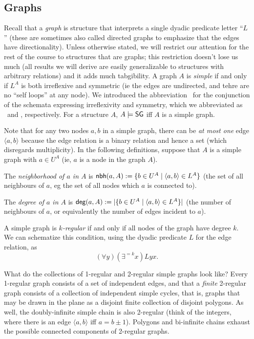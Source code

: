 \subsection*{Graphs}
Recall that a \emph{graph} is structure that interprets a single dyadic predicate letter ``$L$'' (these are sometimes also called directed graphs to emphasize that the edges have directionality). Unless otherwise stated, we will restrict our attention for the rest of the course to structures that are graphs; this restriction doesn't lose us much (all results we will derive are easily generalizable to structures with arbitrary relations) and it adds much tabgibility. A graph $A$ is \emph{simple} if and only if $L^A$ is both irreflexive and symmetric (ie the edges are undirected, and tehre are no ``self loops'' at any node). We introduced the abbreviation \sg\ for the conjunction of the schemata expressing irreflexivity and symmetry, which we abbreviated as \irr\ and \sym, respectively. For a structure $A$, $A \models \mbox{$\mathsf{SG}$}$ iff $A$ is a simple graph. 

Note that for any two nodes $a, b$ in a simple graph, there can be \emph{at most one} edge $\langle a, b \rangle$ because the edge relation is a binary relation and hence a set (which disregards multiplicity). In the following definitions, suppose that $A$ is a simple graph with $a \in U^A$ (ie, $a$ is a node in the graph $A$). 

\begin{definition}
The \emph{neighborhood of $a$ in $A$} is $\mbox{$\mathsf{nbh}(a,A)$} := \{b\in U^A\mid \mbox{$\langle a,b \rangle$}\in L^A\}$ (the set of all neighbours of $a$, eg the set of all nodes which $a$ is connected to). 
\end{definition}

\begin{definition}
The \emph{degree of $a$ in $A$} is $\mbox{$\mathsf{deg}(a,A)$} := \mbox{$|\{b\in U^A\mid \mbox{$\langle a,b \rangle$}\in L^A\}|$}$ (the number of neighbours of $a$, or equivalently the number of edges incident to $a$).
\end{definition}


\begin{definition}
A simple graph is \emph{$k$-regular} if and only if all nodes of the graph have degree $k$. We can schematize this condition, using the dyadic predicate $L$ for the edge relation, as
\[(\forall y)(\exists^{=k}x)Lyx.\]
\end{definition}

What do the collections of 1-regular and 2-regular simple graphs look like? Every 1-regular graph consists of a set of independent edges, and that a \emph{finite} 2-regular graph consists of a collection of independent simple cycles, that is, graphs that may be drawn in the plane as a disjoint finite collection of disjoint polygons. As well, the doubly-infinite simple chain is also 2-regular (think of the integers, where there is an edge $\langle a, b \rangle$ iff $a = b \pm 1$). Polygons and bi-infinite chains exhaust the possible connected components of 2-regular graphs.

